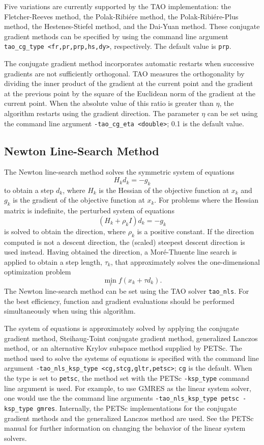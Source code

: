Five variations are currently supported by the TAO implementation: the 
Fletcher-Reeves method, the Polak-Ribi\'ere method, the Polak-Ribi\'ere-Plus 
method\cite{NW99}, the Hestenes-Stiefel method, and the Dai-Yuan method.  
These conjugate gradient methods can be specified by using the command line 
argument {\tt tao\_cg\_type <fr,pr,prp,hs,dy>}, respectively.  The default 
value is {\tt prp}.  

The conjugate gradient method incorporates automatic restarts when successive 
gradients are not sufficiently orthogonal.  TAO measures the orthogonality by 
dividing the inner product of the gradient at the current point and the 
gradient at the previous point by the square of the Euclidean norm of 
the gradient at the current point.  When the absolute value of this 
ratio is greater than $\eta$, the algorithm restarts using the gradient 
direction.  The parameter $\eta$ can be set using the command line argument 
{\tt -tao\_cg\_eta <double>}; 0.1 is the default value.  

\subsection{Newton Line-Search Method}

The Newton line-search method solves the symmetric system of equations
\[
H_k d_k = -g_k
\]
to obtain a step $d_k$, where $H_k$ is the Hessian of the objective function
at $x_k$ and $g_k$ is the gradient of the objective function at $x_k$.
For problems where the Hessian matrix is indefinite, the perturbed system
of equations
\[
(H_k + \rho_k I) d_k = -g_k
\]
is solved to obtain the direction, where $\rho_k$ is a positive constant.
If the direction computed is not a descent direction, the (scaled) steepest 
descent direction is used instead.  Having obtained the direction, 
a Mor\'{e}-Thuente line search is applied to obtain a step length, 
$\tau_k$, that approximately solves the one-dimensional optimization 
problem
\[
\min_\tau f(x_k + \tau d_k).
\]
The Newton line-search method can be set using the TAO solver {\tt tao\_nls}.
For the best efficiency, function and gradient evaluations should be 
performed simultaneously when using this algorithm.

The system of equations is approximately solved by applying the conjugate 
gradient method, Steihaug-Toint conjugate gradient method, generalized 
Lanczos method, or an alternative Krylov subspace method 
supplied by PETSc.  The method used to solve the systems of equations is 
specified with the command line argument 
{\tt -tao\_nls\_ksp\_type <cg,stcg,gltr,petsc>}; {\tt cg} 
is the default.  When the type is set to {\tt petsc}, the method set with 
the PETSc {\tt -ksp\_type} command line argument is used.  For example, to 
use GMRES as the linear system solver, one would use the the command line 
arguments {\tt -tao\_nls\_ksp\_type petsc -ksp\_type gmres}.  Internally,
the PETSc implementations for the conjugate gradient methods and the 
generalized Lanczos method are used.  See the PETSc manual for further 
information on changing the behavior of the linear system solvers.  

